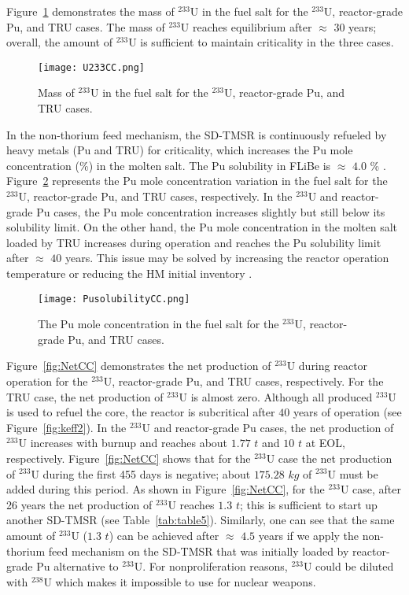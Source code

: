 Figure~\ref{fig:U233CC} demonstrates the mass of $^{233}$U in the fuel salt 
for the $^{233}$U, reactor-grade Pu, and TRU cases. The mass of 
$^{233}$U reaches equilibrium after $\approx$ $30$ years; overall, the 
amount of $^{233}$U is sufficient to maintain criticality in 
the three cases.
\begin{figure}
	\centering
	\texttt{[image: U233CC.png]}
	\caption{Mass of $^{233}$U in the fuel salt for the $^{233}$U, reactor-grade Pu, and TRU cases.}
	\label{fig:U233CC}
\end{figure}

In the non-thorium feed mechanism, the SD-TMSR is continuously refueled by heavy metals (Pu and TRU) for 
criticality, which increases the Pu mole concentration (\%) in the molten salt. 
The Pu solubility in FLiBe is 
$\approx$ $4.0$ \% \cite{ignatiev2012progress,sood1975plutonium}. 
Figure~\ref{fig:PusolubilityCC} represents the Pu mole concentration variation in the fuel salt 
for the $^{233}$U, reactor-grade Pu, and TRU cases, respectively. In the $^{233}$U and reactor-grade Pu cases, the Pu mole concentration increases 
slightly but still below its solubility limit. On the other hand, the Pu 
mole concentration in the molten salt loaded by TRU increases during operation and 
reaches the Pu solubility limit after $\approx$ $40$ years. This issue may 
be solved by increasing the reactor operation temperature or reducing the 
HM initial inventory \cite{zou2018transition}.
\begin{figure}
	\centering
	\texttt{[image: PusolubilityCC.png]}
	\caption{The Pu mole concentration in the fuel salt for the $^{233}$U, reactor-grade Pu, and TRU cases.}
	\label{fig:PusolubilityCC}
\end{figure}
\FloatBarrier

Figure~\ref{fig:NetCC} demonstrates the net production of $^{233}$U during 
reactor operation for the $^{233}$U, reactor-grade Pu, and TRU cases, respectively. For the TRU case, the net production of $^{233}$U is almost 
zero. 
Although all produced $^{233}$U is used to refuel the core, the reactor is subcritical after $40$ years of operation (see Figure~\ref{fig:keff2}).
In the $^{233}$U and reactor-grade Pu cases, the net production of 
$^{233}$U increases with burnup and reaches about $1.77$ $t$ and $10$ $t$ at EOL, respectively. Figure~\ref{fig:NetCC} shows that for the $^{233}$U 
case the net production of $^{233}$U during the first 455 days is negative; 
about $175.28$ $kg$ of $^{233}$U must be added during this period. 
As shown in Figure~\ref{fig:NetCC}, for the $^{233}$U case, after 26 years the net production of $^{233}$U reaches 
$1.3$ $t$; this is sufficient to start up another SD-TMSR (see Table~\ref{tab:table5}). Similarly, 
one can see that the same amount of $^{233}$U ($1.3$ $t$) can be achieved 
after $\approx$ $4.5$ years if we apply the non-thorium feed mechanism on 
the SD-TMSR that was initially loaded by reactor-grade Pu alternative to 
$^{233}$U. For nonproliferation reasons, $^{233}$U could be diluted with $^{238}$U which makes it impossible to use for nuclear weapons.
  
